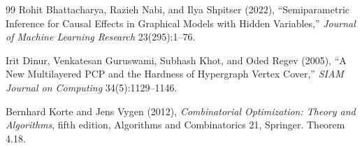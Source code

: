 \documentclass{article}
\begin{document}
\begin{thebibliography}{99}
   Rohit Bhattacharya, Razieh Nabi, and Ilya Shpitser (2022), ``Semiparametric Inference for Causal Effects in Graphical Models with Hidden Variables,'' \emph{Journal of Machine Learning Research} 23(295):1--76.

   Irit Dinur, Venkatesan Guruswami, Subhash Khot, and Oded Regev (2005), ``A New Multilayered PCP and the Hardness of Hypergraph Vertex Cover,'' \emph{SIAM Journal on Computing} 34(5):1129--1146.

   Bernhard Korte and Jens Vygen (2012), \emph{Combinatorial Optimization: Theory and Algorithms}, fifth edition, Algorithms and Combinatorics 21, Springer. Theorem 4.18.

\end{thebibliography}
\end{document}
